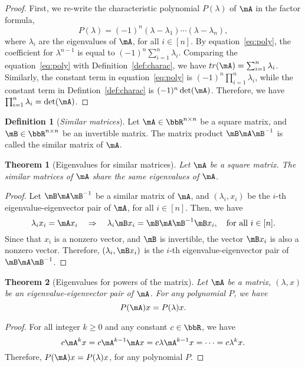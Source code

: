 \documentclass[11pt]{article}
\theoremstyle{plain}
\newtheorem{thm}{Theorem}[section]
\theoremstyle{definition}
\newtheorem{defn}{Definition}
\begin{document}
\begin{proof}
	First, we re-write the characteristic polynomial $P(\lambda)$ of $\mA$ in the factor formula,
	\begin{equation}\label{eq:poly}
		P(\lambda) = (-1)^n (\lambda - \lambda_1)\cdots (\lambda - \lambda_n), 
	\end{equation}   
	where $\lambda_i$ are the eigenvalues of $\mA$, for all $ i \in [n]$. By equation~\eqref{eq:poly}, the coefficient for $\lambda^{n-1}$ is equal to $(-1)^n\sum_{i=1}^n \lambda_i$. Comparing the equation~\eqref{eq:poly} with Definition~\ref{def:charac}, we have $tr(\mA) = \sum_{i=1}^n \lambda_i$. Similarly, the constant term in equation~\eqref{eq:poly} is $(-1)^n \prod_{i=1}^n \lambda_i $, while the constant term in Defintion~\ref{def:charac} is $(-1)^n \det(\mA)$.  Therefore, we have $\prod_{i=1}^n \lambda_i = \det(\mA)$.
\end{proof}

\begin{defn}[\textit{Similar matrices}]\label{def:similar}
	Let $\mA \in \bbR^{n \times n}$ be a square matrix, and $\mB \in \bbR^{n \times n}$ be an invertible matrix. The matrix product $\mB \mA \mB^{-1}$ is called the similar matrix of $\mA$.
\end{defn}

\begin{thm}[Eigenvalues for similar matrices]\label{thm:similar}
	Let $\mA$ be a square matrix. The similar matrices of $\mA$ share the same eigenvalues of $\mA$.
\end{thm}
\begin{proof}
	Let $\mB \mA \mB^{-1}$ be a similar matrix of $\mA$, and $(\lambda_i, x_i)$ be the $i$-th eigenvalue-eigenvector pair of $\mA$, for all $i \in [n]$. Then, we have
	\[ \lambda_i x_i = \mA x_i \quad \Rightarrow \quad \lambda_i \mB x_i = \mB \mA \mB^{-1} \mB x_i, \quad \text{for all }i \in [n]. \]
	Since that $x_i$ is a nonzero vector, and $\mB$ is invertible, the vector $\mB x_i$ is also a nonzero vector. Therefore, $(\lambda_i, \mB x_i)$ is the $i$-th eigenvalue-eigenvector pair of $\mB \mA \mB^{-1}$.
\end{proof}

\begin{thm}[Eigenvalues for powers of the matrix]
	Let $\mA$ be a matrix, $(\lambda,x)$  be an eigenvalue-eigenvector pair of $\mA$. For any polynomial $P$, we have
	\[ P(\mA) x = P(\lambda) x. \]
\end{thm}
\begin{proof}
	For all integer $k \geq 0$ and any constant $c \in \bbR$, we have
	\[ c\mA^k x = c\mA^{k-1} \mA x= c\lambda \mA^{k-1} x = \cdots = c\lambda^k x.\]
	Therefore, $P(\mA)x = P(\lambda)x$, for any polynomial $P$.
\end{proof}
\end{document}
